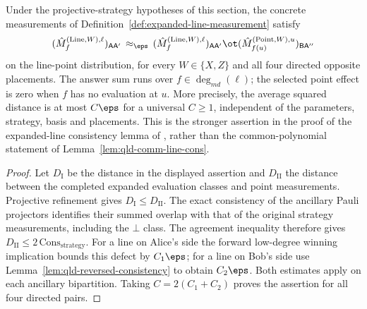 \begin{lemma}
	\label{lem:expanded-line-point-linear-error}
	\leanok
	Under the projective-strategy hypotheses of this section, the concrete
	measurements of Definition~\ref{def:expanded-line-measurement} satisfy
	\begin{equation}
		\label{eq:qld-comm-line-pt-cons-eps}
		(\hat{M}^{(\mathrm{Line},W),\ell}_f)_{\mathsf{A}\mathsf{A}'}
		\,\approx_{\eps}\,
		(\hat{M}^{(\mathrm{Line},W),\ell}_f)_{\mathsf{A}\mathsf{A}'}
		\ot (\hat{M}^{(\mathrm{Point},W),u}_{f(u)})_{\mathsf{B}\mathsf{A}''}
	\end{equation}
	on the line-point distribution, for every $W\in\{X,Z\}$ and all four
	directed opposite placements. The answer sum runs over
	$f\in\deg_{md}(\ell)$; the selected point effect is zero when $f$ has
	no evaluation at $u$. More precisely, the average squared distance is at
	most $C\eps$ for a universal $C\geq1$, independent of the parameters,
	strategy, basis and placements. This is the stronger assertion in the
	proof of the expanded-line consistency lemma of \cite{Ji2020MIPStar},
	rather than the common-polynomial statement of
	Lemma~\ref{lem:qld-comm-line-cons}.
\end{lemma}
\begin{proof}
	\leanok
	Let $D_{\mathrm I}$ be the distance in the displayed assertion and
	$D_{\mathrm{II}}$ the distance between the completed expanded
	evaluation classes and point measurements. Projective refinement gives
	$D_{\mathrm I}\leq D_{\mathrm{II}}$. The exact consistency of the
	ancillary Pauli projectors identifies their summed overlap with that
	of the original strategy measurements, including the $\bot$ class.
	The agreement inequality therefore gives
	$D_{\mathrm{II}}\leq 2\,\mathrm{Cons}_{\mathrm{strategy}}$.
	For a line on Alice's side the forward low-degree winning implication
	bounds this defect by $C_1\eps$; for a line on Bob's side use
	Lemma~\ref{lem:qld-reversed-consistency} to obtain $C_2\eps$.
	Both estimates apply on each ancillary bipartition. Taking
	$C=2(C_1+C_2)$ proves the assertion for all four directed pairs.
\end{proof}

